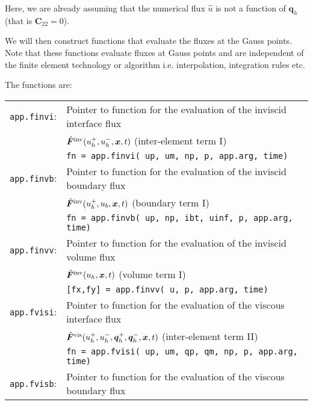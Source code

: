 \documentclass[11pt]{article}
\begin{document}
\begin{itemize}
Here, we are already assuming that the numerical flux $\hat{u}$ is not a function of $\bm{q}_h$ (that is $\bm{C}_{22} = 0$).






We will then construct functions that evaluate the fluxes at the Gauss points. Note that these functions evaluate fluxes at Gauss points and are independent of the finite element
technology or algorithm i.e. interpolation, integration rules etc.

The functions are:

\begin{tabular}{|ll}
	   \texttt{app.finvi}: & Pointer to function for the evaluation of the inviscid interface flux  \\
	                           & $\hat{\bm{F}}^{\rm inv}(u_h^+,u_h^-,\bm{x},t)$ (inter-element term I) \\
	                           & \texttt{fn = app.finvi( up, um, np, p, app.arg, time)}
	                           \\
	   \texttt{app.finvb}: &  Pointer to function for the evaluation of the inviscid boundary flux \\   
	                               &  $\hat{\bm{F}}^{\rm inv}(u_h^+,u_b,\bm{x},t)$ (boundary  term I) \\                   
	                            & \texttt{fn = app.finvb( up, np, ibt, uinf, p, app.arg, time)}
	                            \\
	    \texttt{app.finvv}: &  Pointer to function for the evaluation of the inviscid volume flux\\   
	                               &  $\hat{\bm{F}}^{\rm inv}(u_h,\bm{x},t)$  (volume term I) \\  
	                                & \texttt{[fx,fy] = app.finvv( u, p, app.arg, time)}   
	                                \\
	    \texttt{app.fvisi}: & Pointer to function for the evaluation of the viscous interface flux \\
	                           &  $\hat{\bm{F}}^{\rm vis}(u_h^+, u_h^-,\bm{q}_h^+, \bm{q}_h^-,\bm{x},t)$ (inter-element term II) \\
	                           & \texttt{fn = app.fvisi( up, um, qp, qm, np, p, app.arg, time)}
	                           	   \\
	   \texttt{app.fvisb}: &  Pointer to function for the evaluation of the viscous boundary flux  \\   

\end{tabular}
\end{itemize}
\end{document}
